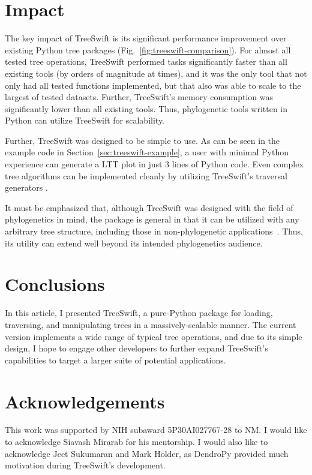 \section{Impact}\label{sec:treeswift-impact}
The key impact of TreeSwift is its significant performance improvement over existing Python tree packages (Fig.~\ref{fig:treeswift-comparison}). For almost all tested tree operations, TreeSwift performed tasks significantly faster than all existing tools (by orders of magnitude at times), and it was the only tool that not only had all tested functions implemented, but that also was able to scale to the largest of tested datasets. Further, TreeSwift's memory consumption was significantly lower than all existing tools. Thus, phylogenetic tools written in Python can utilize TreeSwift for scalability.

Further, TreeSwift was designed to be simple to use. As can be seen in the example code in Section~\ref{sec:treeswift-example}, a user with minimal Python experience can generate a \gls{LTT} plot in just 3 lines of Python code. Even complex tree algorithms can be implemented cleanly by utilizing TreeSwift's traversal generators \cite{Balaban2019}.

It must be emphasized that, although TreeSwift was designed with the field of phylogenetics in mind, the package is general in that it can be utilized with any arbitrary tree structure, including those in non-phylogenetic applications~\cite{Moshiri2018b}. Thus, its utility can extend well beyond its intended phylogenetics audience.

\section{Conclusions}\label{sec:treeswift-conclusions}
In this article, I presented TreeSwift, a pure-Python package for loading, traversing, and manipulating trees in a massively-scalable manner. The current version implements a wide range of typical tree operations, and due to its simple design, I hope to engage other developers to further expand TreeSwift's capabilities to target a larger suite of potential applications.

\section{Acknowledgements}
This work was supported by NIH subaward 5P30AI027767-28 to NM. I would like to acknowledge Siavash Mirarab for his mentorship. I would also like to acknowledge Jeet Sukumaran and Mark Holder, as DendroPy provided much motivation during TreeSwift's development.

